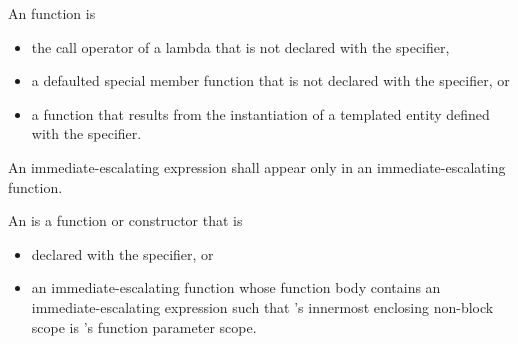 \pnum
{}%
An  function is
\begin{itemize}
\item
the call operator of a lambda that is not declared
with the  specifier,
\item
a defaulted special member function
that is not declared with the  specifier, or
\item
a function that results from the instantiation
of a templated entity defined with the  specifier.
\end{itemize}
An immediate-escalating expression shall appear only
in an immediate-escalating function.

\pnum
An  is a function or constructor that is
\begin{itemize}
\item
declared with the  specifier, or
\item
an immediate-escalating function 
whose function body contains an immediate-escalating expression 
such that 's innermost enclosing non-block scope
is 's function parameter scope.
\end{itemize}
